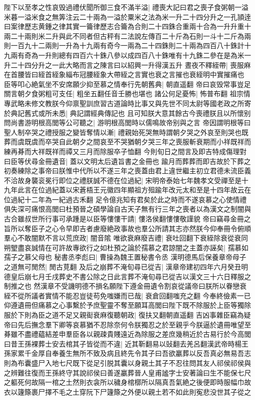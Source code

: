 陛下以至孝之性哀毁過禮伏聞所御三食不滿半溢|{
	禮喪大記曰君之喪子食粥朝一溢米暮一溢米食之無筭注云二十兩為一溢於粟米之法為米一升二十四分升之一孔頴逹曰案律歷志黄鍾之律其實一籥律歷志合籥為合則二十四銖合重兩十合為一升升重十兩二十兩則米二升與此不同者但古秤有二法說左傳百二十斤為石則一斗十二斤為兩則一百九十二兩則一升為十九兩有奇今一兩為二十四銖則二十兩為四百八十銖計十九兩有奇為一升則總有四百六十銖八參以成四百八十銖唯有十九銖二參在是為米一升二十四分升之一此大略而言之陳言曰以紹興一升得漢五升}
晝夜不釋絰帶|{
	喪服麻在首腰皆曰絰首絰象緇布冠腰絰象大帶絰之言實也衰之言摧也衰絰明中實摧痛也}
臣等叩心絶氣坐不安席願少抑至慕之情奉行先朝舊典|{
	朝直遥翻}
帝曰哀毁常事豈足關言朝夕食粥粗可支任|{
	粗坐五翻任音壬勝也堪也}
諸公何足憂怖|{
	怖普布翻}
祖宗情專武略未修文教朕今仰禀聖訓庶習古道論時比事又與先世不同太尉等國老政之所寄於典記舊式或所未悉|{
	典記謂經典傳記也}
且可知朕大意其餘古今喪禮朕且以所懷别問尚書游明根高閭等公可聽之|{
	游明根高閭時以儒鳴故帝别與之言}
帝因謂明根等曰聖人制卒哭之禮授服之變皆奪情以漸|{
	禮親始死哭無時謂朝夕哭之外哀至則哭也既葬而虞既虞而卒哭自此朝夕之間哀至不哭猶朝夕哭三年之喪服斬衰期而小祥既祥而練再朞而大祥既祥而禫又三月而除服卒子恤翻}
今則旬日之間言及即吉特成傷理對曰臣等伏尋金冊遺音|{
	蓋以文明太后遺旨書之金冊也}
踰月而葬葬而即吉故於下葬之初奏練除之事帝曰朕惟中代所以不遂三年之喪蓋由君上違世繼主初立君德未流臣義不洽故身襲衮冕行即位之禮朕誠不德在位過紀|{
	宋明帝泰始七年魏孝文受禪至是十九年此言在位過紀蓋以宋蒼梧王元徽四年顯祖方殂踰年改元太和至是十四年故云在位過紀十二年為一紀過古禾翻}
足令億兆知有君矣於此之時而不遂哀慕之心使情禮俱失深可痛恨高閭曰杜預晉之碩學論自古天子無有行三年之喪者以為漢文之制闇與古合雖叔世所行事可承踵是以臣等慺慺干請|{
	慺洛侯翻慺慺敬謹貌}
帝曰竊尋金冊之旨所以奪臣子之心令早即吉者慮廢絶政事故也羣公所請其志亦然朕今仰奉冊令俯順羣心不敢闇默不言以荒庶政|{
	闇音隂}
唯欲衰麻廢吉禮|{
	衰吐回翻下衰絰除衰從衰同}
朔朢盡哀誠情在可許故專欲行之如杜預之論於孺慕之君諒闇之主蓋亦誣矣|{
	孺慕如孺子之慕父母也}
秘書丞李彪曰|{
	曹操為魏王置秘書令丞}
漢明德馬后保養章帝母子之道無可閒然|{
	閒古莧翻}
及后之崩葬不淹旬尋已從吉|{
	漢章帝建初四年六月癸丑明德皇后崩七月壬戌葬史不書公除之日此言葬不淹旬尋已從吉以漢文三十六日釋服之制推之也}
然漢章不受譏明德不損名願陛下遵金冊遺令割哀從議帝曰朕所以眷戀衰絰不從所議者實情不能忍豈徒苟免嗤嫌而已哉|{
	衰倉回翻嗤充之翻}
今奉終儉素一已仰遵遺冊但痛慕之心事繫於予庶聖靈不奪至願耳高閭曰陛下既不除服於上臣等獨除服於下則為臣之道不足又親䘖衰麻復聽朝政|{
	復扶又翻朝直遥翻}
吉凶事雜臣竊為疑帝曰先后撫念羣下卿等哀慕猶不忍除奈何令朕獨忍之於至親乎今朕逼於遺冊唯望至朞雖不盡禮藴結差申羣臣各以親疎貴賤遠近為除服之差庶幾稍近於古易行於今高閭曰昔王孫裸葬士安去棺其子皆從而不違|{
	近其靳翻易以䜴翻去羌呂翻漢武帝時楊王孫家累千金厚自奉養生無所不致及病且終先令其子曰吾欲臝葬以反吾真必無易吾志則為布囊盛尸入地七尺既下從足引脱其囊以身親土其子不忍往問其友人祁侯祁侯與之辨難往復而王孫終守其說祁侯曰善遂臝葬晉人皇甫謐字士安著論曰生不能保七尺之軀死何故隔一棺之土然則衣衾所以穢身棺槨所以隔真吾氣絶之後便即時服幅巾故衣以籧篨裹尸擇不毛之土穿阮下尸籧篨之外便以親土若不如此則寃悲没世其子從之}
